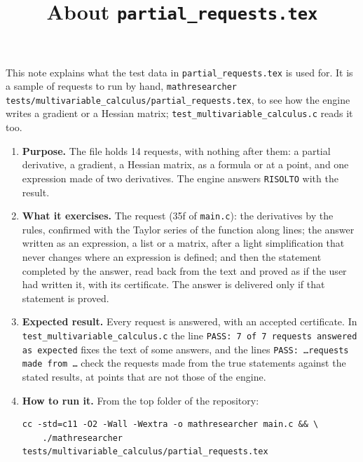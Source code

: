 \documentclass[11pt,a4paper]{article}
\title{About \texttt{partial\_requests.tex}}
\author{}
\date{}
\begin{document}
\maketitle
This note explains what the test data in \texttt{partial\_requests.tex} is used for. It is a sample of requests to run by hand, \texttt{mathresearcher tests/multivariable\_calculus/partial\_requests.tex}, to see how the engine writes a gradient or a Hessian matrix; \texttt{test\_multivariable\_calculus.c} reads it too.

\begin{enumerate}
\item \textbf{Purpose.} The file holds 14 requests, with nothing after them: a partial derivative, a gradient, a Hessian matrix, as a formula or at a point, and one expression made of two derivatives. The engine answers \texttt{RISOLTO} with the result.

\item \textbf{What it exercises.} The request (35f of \texttt{main.c}): the derivatives by the rules, confirmed with the Taylor series of the function along lines; the answer written as an expression, a list or a matrix, after a light simplification that never changes where an expression is defined; and then the statement completed by the answer, read back from the text and proved as if the user had written it, with its certificate. The answer is delivered only if that statement is proved.

\item \textbf{Expected result.} Every request is answered, with an accepted certificate. In \texttt{test\_multivariable\_calculus.c} the line \texttt{PASS: 7 of 7 requests answered as expected} fixes the text of some answers, and the lines \texttt{PASS: \ldots requests made from \ldots} check the requests made from the true statements against the stated results, at points that are not those of the engine.

\item \textbf{How to run it.} From the top folder of the repository:
\begin{verbatim}
cc -std=c11 -O2 -Wall -Wextra -o mathresearcher main.c && \
    ./mathresearcher tests/multivariable_calculus/partial_requests.tex
\end{verbatim}
\end{enumerate}
\end{document}
